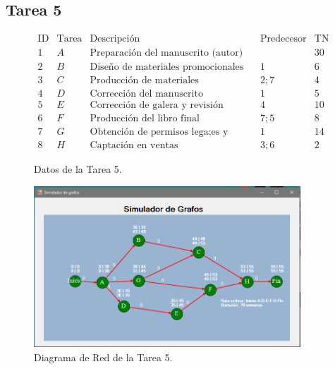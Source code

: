 \documentclass[a4paper, 12pt]{article}
\begin{document}
    \subsection{Tarea 5}
    \begin{figure}[H]
        \[\begin{matrix}
            \text{ID}&\text{Tarea}&\text{Descripción}&\text{Predecesor}&\text{TN}\\
            1&A&\text{Preparación del manuscrito (autor)}&&30\\
            2&B&\text{Diseño de materiales promocionales}&1&6\\
            3&C&\text{Producción de materiales promocionales}&2; 7&4\\
            4&D&\text{Corrección del manuscrito}&1&5\\
            5&E&\text{Corrección de galera y revisión}&4&10\\
            6&F&\text{Producción del libro final}&7; 5&8\\
            7&G&\text{Obtención de permisos lega;es y derechos}&1&14\\
            8&H&\text{Captación en ventas}&3; 6&2
        \end{matrix}\]
        \caption{Datos de la Tarea 5.}
    \end{figure}
    \begin{figure}[H]
        \centering
        \includegraphics[width=10cm]{TAREA5.PNG}
        \caption{Diagrama de Red de la Tarea 5.}
    \end{figure}
\end{document}
